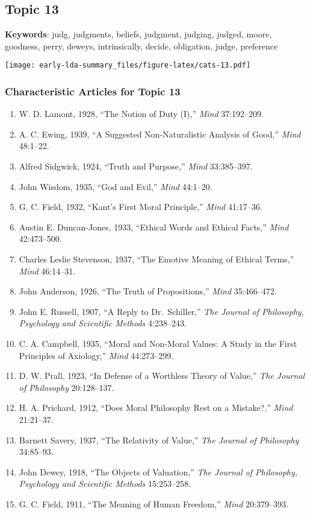 \documentclass[
]{article}
\begin{document}
\hypertarget{topic-13}{%
\subsection{Topic 13}\label{topic-13}}

\textbf{Keywords}: judg, judgments, beliefs, judgment, judging, judged,
moore, goodness, perry, deweys, intrinsically, decide, obligation,
judge, preference

\texttt{[image: early-lda-summary\_files/figure-latex/cats-13.pdf]}
\newpage 

\hypertarget{characteristic-articles-for-topic-13}{%
\subsubsection{Characteristic Articles for Topic
13}\label{characteristic-articles-for-topic-13}}

\begin{enumerate}
\def\labelenumi{\arabic{enumi}.}
\item
  W. D. Lamont, 1928, ``The Notion of Duty (I),'' \emph{Mind}
  37:192--209.
\item
  A. C. Ewing, 1939, ``A Suggested Non-Naturalistic Analysis of Good,''
  \emph{Mind} 48:1--22.
\item
  Alfred Sidgwick, 1924, ``Truth and Purpose,'' \emph{Mind} 33:385--397.
\item
  John Wisdom, 1935, ``God and Evil,'' \emph{Mind} 44:1--20.
\item
  G. C. Field, 1932, ``Kant's First Moral Principle,'' \emph{Mind}
  41:17--36.
\item
  Austin E. Duncan-Jones, 1933, ``Ethical Words and Ethical Facts,''
  \emph{Mind} 42:473--500.
\item
  Charles Leslie Stevenson, 1937, ``The Emotive Meaning of Ethical
  Terms,'' \emph{Mind} 46:14--31.
\item
  John Anderson, 1926, ``The Truth of Propositions,'' \emph{Mind}
  35:466--472.
\item
  John E. Russell, 1907, ``A Reply to Dr.~Schiller,'' \emph{The Journal
  of Philosophy, Psychology and Scientific Methods} 4:238--243.
\item
  C. A. Campbell, 1935, ``Moral and Non-Moral Values: A Study in the
  First Principles of Axiology,'' \emph{Mind} 44:273--299.
\item
  D. W. Prall, 1923, ``In Defense of a Worthless Theory of Value,''
  \emph{The Journal of Philosophy} 20:128--137.
\item
  H. A. Prichard, 1912, ``Does Moral Philosophy Rest on a Mistake?,''
  \emph{Mind} 21:21--37.
\item
  Barnett Savery, 1937, ``The Relativity of Value,'' \emph{The Journal
  of Philosophy} 34:85--93.
\item
  John Dewey, 1918, ``The Objects of Valuation,'' \emph{The Journal of
  Philosophy, Psychology and Scientific Methods} 15:253--258.
\item
  G. C. Field, 1911, ``The Meaning of Human Freedom,'' \emph{Mind}
  20:379--393.
\end{enumerate}
\end{document}
